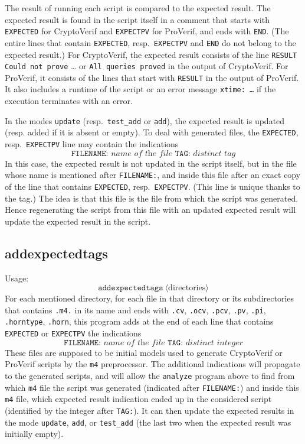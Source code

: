 \documentclass{article}
\newcommand{\nonterm}[1]{\langle\textrm{#1}\rangle}
\begin{document}
The result of running each script is compared to the expected result. The expected result is found in the script itself
in a comment that starts with \texttt{EXPECTED} for CryptoVerif and \texttt{EXPECTPV} for ProVerif, and ends with \texttt{END}. (The entire lines that contain \texttt{EXPECTED}, resp.~\texttt{EXPECTPV} and \texttt{END} do not belong to the expected result.)
For CryptoVerif, the expected result consists of the line \texttt{RESULT Could not prove} \ldots{} or \texttt{All queries proved} in the output of CryptoVerif. For ProVerif, it consists of the lines that start with \texttt{RESULT} in the output of ProVerif. It also includes a runtime of the script or an error message \texttt{xtime: \dots} if the execution terminates with an error.

In the modes \texttt{update} (resp.~\texttt{test\_add} or \texttt{add}), the expected result is updated (resp. added if it is absent or empty). To deal with generated files, the \texttt{EXPECTED}, resp.~\texttt{EXPECTPV} line may contain the indications
\[\texttt{FILENAME: }\textit{name of the file}\texttt{ TAG: }\textit{distinct tag}\]
In this case, the expected result is not updated in the script itself, but in the file whose
name is mentioned after \texttt{FILENAME:}, and inside this file after an exact copy of the line that contains \texttt{EXPECTED}, resp.~\texttt{EXPECTPV}. (This line is unique thanks to the tag.) The idea is that this file is the file from which the script was generated. Hence regenerating the script from this file with an updated expected result will update the expected result in the script.

\subsection{\ttfamily addexpectedtags}

Usage:
\[\texttt{addexpectedtags}\ \nonterm{directories}\]
For each mentioned directory, for each file in that directory or its subdirectories that contains \texttt{.m4.} in its name and ends with \texttt{.cv},
\texttt{.ocv}, \texttt{.pcv}, \texttt{.pv}, \texttt{.pi}, \texttt{.horntype}, \texttt{.horn}, this program adds at the end of each line that contains \texttt{EXPECTED} or \texttt{EXPECTPV} the indications
\[\texttt{FILENAME: }\textit{name of the file}\texttt{ TAG: }\textit{distinct integer}\]
These files are supposed to be initial models used to generate CryptoVerif or ProVerif scripts by the \texttt{m4} preprocessor. The additional indications will
propagate to the generated scripts, and will allow the \texttt{analyze} program above to find from which \texttt{m4} file the script was generated (indicated after \texttt{FILENAME:}) and inside this \texttt{m4} file, which expected result indication ended up in the considered script (identified by the integer after \texttt{TAG:}). It can then update the expected results in the mode \texttt{update}, \texttt{add}, or \texttt{test\_add} (the last two when the expected result was initially empty).
\end{document}
